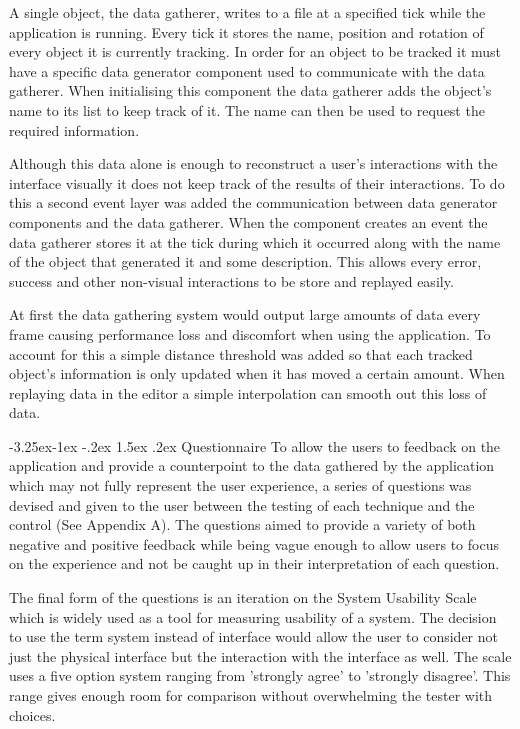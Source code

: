 \documentclass[12pt]{article}
\makeatletter
\renewcommand{\subsubsection}{\@startsection{subsubsection}{2}{\z@}%
             {-3.25ex\@plus -1ex \@minus -.2ex}%
             {1.5ex \@plus .2ex}%
             {\normalfont\normalsize\scshape\bfseries}}
\makeatother
\begin{document}
A single object, the data gatherer, writes to a file at a specified tick while the application is running. Every tick it stores the name, position and rotation of every object it is currently tracking. In order for an object to be tracked it must have a specific data generator component used to communicate with the data gatherer. When initialising this component the data gatherer adds the object's name to its list to keep track of it. The name can then be used to request the required information.

Although this data alone is enough to reconstruct a user's interactions with the interface visually it does not keep track of the results of their interactions. To do this a second event layer was added the communication between data generator components and the data gatherer. When the component creates an event the data gatherer stores it at the tick during which it occurred along with the name of the object that generated it and some description. This allows every error, success and other non-visual interactions to be store and replayed easily.

At first the data gathering system would output large amounts of data every frame causing performance loss and discomfort when using the application. To account for this a simple distance threshold was added so that each tracked object's information is only updated when it has moved a certain amount. When replaying data in the editor a simple interpolation can smooth out this loss of data.

\subsubsection{Questionnaire}
To allow the users to feedback on the application and provide a counterpoint to the data gathered by the application which may not fully represent the user experience, a series of questions was devised and given to the user between the testing of each technique and the control (See Appendix A). The questions aimed to provide a variety of both negative and positive feedback while being vague enough to allow users to focus on the experience and not be caught up in their interpretation of each question.

The final form of the questions is an iteration on the System Usability Scale which is widely used as a tool for measuring usability of a system. The decision to use the term system instead of interface would allow the user to consider not just the physical interface but the interaction with the interface as well. The scale uses a five option system ranging from 'strongly agree' to 'strongly disagree'. This range gives enough room for comparison without overwhelming the tester with choices. 
\end{document}
